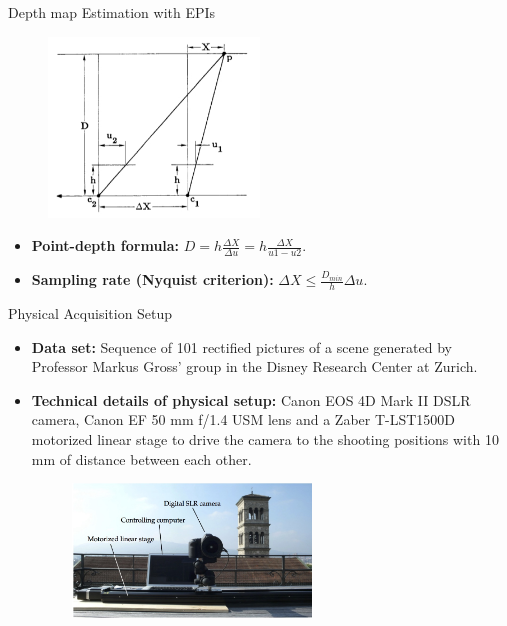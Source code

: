 \begin{frame}{Depth map Estimation with EPIs}
\begin{block}{}
\begin{figure}[h!]
\includegraphics[width=0.5\textwidth]{../../Diagrams/stereo-dist.jpg}
\end{figure}
\pause
\begin{itemize}
\item \textbf{Point-depth formula:} $D= h\frac{\Delta X}{\Delta u}=h\frac{\Delta X}{u1-u2}$.
\pause
\item \textbf{Sampling rate (Nyquist criterion):} $\Delta X\leq \frac{D_{min}}{h}\Delta u$.
\end{itemize}
\end{block}
\end{frame}

\begin{frame}{Physical Acquisition Setup}
\begin{block}{}
\begin{itemize}
\item \textbf{Data set:} Sequence of 101 rectified pictures of a scene generated by Professor Markus Gross' group in the Disney Research Center at Zurich.
\pause
\item \textbf{Technical details of physical setup:} Canon EOS 4D Mark II DSLR camera, Canon EF 50 mm f/1.4 USM lens and a Zaber T-LST1500D motorized linear stage to drive the camera to the shooting positions with 10 mm of distance between each other. 
\pause
\begin{figure}[h!]
\includegraphics[width=0.6\textwidth]{../../Diagrams/setting.jpg}
\end{figure}
\end{itemize}
\end{block}
\end{frame}

